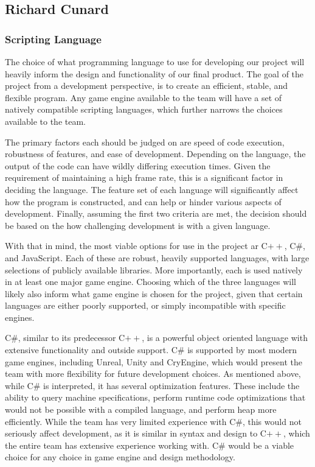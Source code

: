 \documentclass[onecolumn, draftclsnofoot,10pt, compsoc]{IEEEtran}
\newcounter{threesection}[subsubsection]
\newcounter{foursection}[threesection]
\begin{document}
\pagebreak
\subsection{Richard Cunard}

\subsubsection{Scripting Language}

The choice of what programming language to use for developing our project will heavily inform the design and functionality of our final product. The goal of the project from a development perspective, is to create an efficient, stable, and flexible program. Any game engine available to the team will have a set of natively compatible scripting languages, which further narrows the choices available to the team.

The primary factors each should be judged on are speed of code execution, robustness of features, and ease of development. Depending on the language, the output of the code can have wildly differing execution times. Given the requirement of maintaining a high frame rate, this is a significant factor in deciding the language. The feature set of each language will significantly affect how the program is constructed, and can help or hinder various aspects of development. Finally, assuming the first two criteria are met, the decision should be based on the how challenging development is with a given language.

With that in mind, the most viable options for use in the project ar C$++$, C\#, and JavaScript. Each of these are robust, heavily supported languages, with large selections of publicly available libraries. More importantly, each is used natively in at least one major game engine. Choosing which of the three languages will likely also inform what game engine is chosen for the project, given that certain languages are either poorly supported, or simply incompatible with specific engines.

C\#, similar to its predecessor C$++$, is a powerful object oriented language with extensive functionality and outside support. C\# is supported by most modern game engines, including Unreal, Unity and CryEngine, which would present the team with more flexibility for future development choices. As mentioned above, while C\# is interpreted, it has several optimization features. These include the ability to query machine specifications, perform runtime code optimizations that would not be possible with a compiled language, and perform heap more efficiently. While the team has very limited experience with C\#, this would not seriously affect development, as it is similar in syntax and design to C$++$, which the entire team has extensive experience working with. C\# would be a viable choice for any choice in game engine and design methodology.\cite{richTech1}\cite{richTech2}
\end{document}
